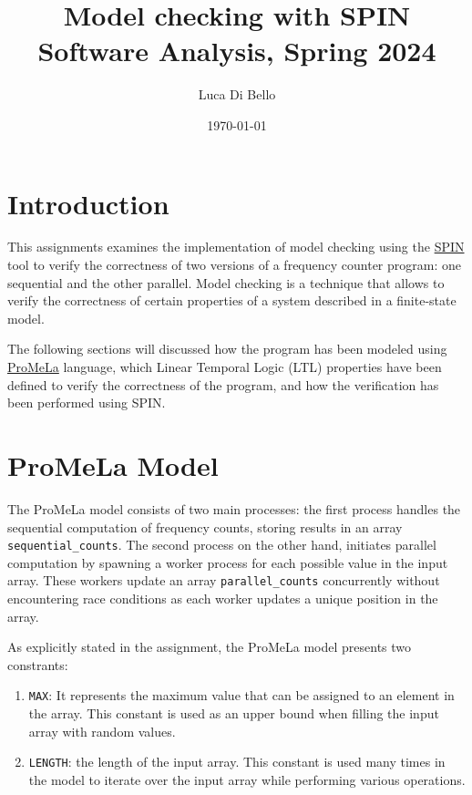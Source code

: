 \documentclass[a4paper, 11pt]{article}
\title{Model checking with SPIN \\[1ex] \large Software Analysis, Spring 2024}
\author{Luca Di Bello}
\date{\today}
\begin{document}
\maketitle
\tableofcontents

\section{Introduction}

This assignments examines the implementation of model checking using the \href{https://spinroot.com/spin/whatispin.html}{SPIN} tool to verify the correctness of two versions of a frequency counter program: one sequential and the other parallel. Model checking is a technique that allows to verify the correctness of certain properties of a system described in a finite-state model.

\vspace{1em}

\noindent The following sections will discussed how the program has been modeled using \href{https://en.wikipedia.org/wiki/Promela}{ProMeLa} language, which Linear Temporal Logic (LTL) properties have been defined to verify the correctness of the program, and how the verification has been performed using SPIN.

\pagebreak

\section{ProMeLa Model}

The ProMeLa model consists of two main processes: the first process handles the sequential computation of frequency counts, storing results in an array \texttt{sequential\_counts}. The second process on the other hand, initiates parallel computation by spawning a worker process for each possible value in the input array. These workers update an array \texttt{parallel\_counts} concurrently without encountering race conditions as each worker updates a unique position in the array.

As explicitly stated in the assignment, the ProMeLa model presents two constrants:

\begin{enumerate}
	\item \texttt{MAX}: It represents the maximum value that can be assigned to an element in the array. This constant is used as an upper bound when filling the input array with random values.
	\item \texttt{LENGTH}: the length of the input array. This constant is used many times in the model to iterate over the input array while performing various operations.
\end{enumerate}
\end{document}
